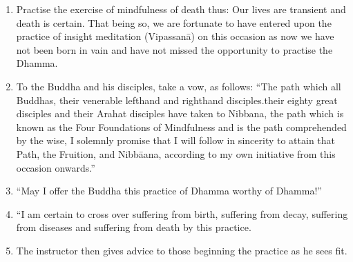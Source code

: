 \documentclass[a5paper,10pt,english]{book}
\begin{document}
\begin{enumerate}
%
\setcounter{enumi}{4}
\item {} 
\sphinxAtStartPar
Practise the exercise of mindfulness of death thus: Our lives are transient and death is certain. That being so, we are fortunate to have entered upon the practice of insight meditation (Vipassanā) on this occasion as now we have not been born in vain and have not missed the opportunity to practise the Dhamma.

\item {} 
\sphinxAtStartPar
To the Buddha and his disciples, take a vow, as follows: “The path which all Buddhas, their venerable left\sphinxhyphen{}hand and right\sphinxhyphen{}hand disciples.their eighty great disciples and their Arahat disciples have taken to Nibbana, the path which is known as the Four Foundations of Mindfulness and is the path comprehended by the wise, I solemnly promise that I will follow in sincerity to attain that Path, the Fruition, and Nibbāana, according to my own initiative from this occasion onwards.”

\item {} 
\sphinxAtStartPar
“May I offer the Buddha this practice of Dhamma worthy of Dhamma!”

\item {} 
\sphinxAtStartPar
“I am certain to cross over suffering from birth, suffering from decay, suffering from diseases and suffering from death by this practice.

\item {} 
\sphinxAtStartPar
The instructor then gives advice to those beginning the practice as he sees fit.

\end{enumerate}
\end{document}
